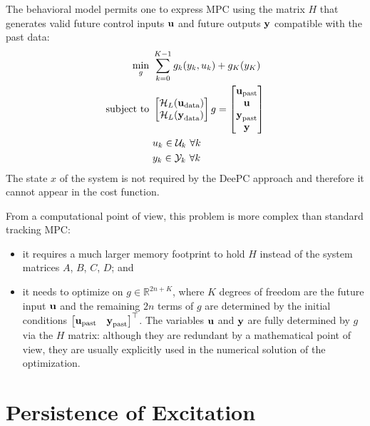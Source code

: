 The behavioral model permits one to express MPC using the matrix $H$ that generates valid future control inputs $\boldsymbol{\mathrm{u}}$ and future outputs $\boldsymbol{\mathrm{y}}$ compatible with the past data:
\begin{equation*}
  \begin{aligned}
    \min_g\ & \sum_{k=0}^{K-1} g_k(y_k,u_k) + g_K(y_K) \\
    \textrm{subject to } & \begin{bmatrix}
                             \mathcal{H}_L(\boldsymbol{\mathrm{u}}_\textrm{data}) \\ \mathcal{H}_L(\boldsymbol{\mathrm{y}}_\textrm{data})
                           \end{bmatrix} g =
                           \begin{bmatrix}
                             \boldsymbol{\mathrm{u}}_\textrm{past} \\ \boldsymbol{\mathrm{u}} \\ \boldsymbol{\mathrm{y}}_\textrm{past} \\ \boldsymbol{\mathrm{y}}
                           \end{bmatrix} \\
                            & u_k \in \mathcal{U}_k\ \forall k \\
                            & y_k \in \mathcal{Y}_k\ \forall k
  \end{aligned}
\end{equation*}
The state $x$ of the system is not required by the DeePC approach and therefore it cannot appear in the cost function.

From a computational point of view, this problem is more complex than standard tracking MPC:
\begin{itemize}
\item it requires a much larger memory footprint to hold $H$ instead of the system matrices $A$, $B$, $C$, $D$; and
\item it needs to optimize on $g\in\mathbb{R}^{2n+K}$, where $K$ degrees of freedom are the future input $\boldsymbol{\mathrm{u}}$ and the remaining $2n$ terms of $g$ are determined by the initial conditions $
  \begin{bmatrix}
    \boldsymbol{\mathrm{u}}_\textrm{past} & \boldsymbol{\mathrm{y}}_\textrm{past}
  \end{bmatrix}^\top
  $. The variables $\boldsymbol{\mathrm{u}}$ and $\boldsymbol{\mathrm{y}}$ are fully determined by $g$ via the $H$ matrix: although they are redundant by a mathematical point of view, they are usually explicitly used in the numerical solution of the optimization.
\end{itemize}

\section{Persistence of Excitation}
\label{sec:persistence-excitation}

